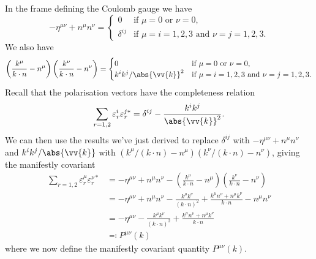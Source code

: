 \documentclass[fleqn]{NotesClass}
\newcommand{\minkowskiMetric}{\eta}
\begin{document}
    In the frame defining the Coulomb gauge we have
    \begin{equation}
        -\minkowskiMetric^{\mu\nu} + n^\mu n^\nu = 
        \begin{cases}
            0 & \text{if } \mu = 0 \text{ or } \nu = 0,\\
            \delta^{ij} & \text{if } \mu = i = 1, 2, 3 \text{ and } \nu = j = 1, 2, 3.
        \end{cases}
    \end{equation}
    We also have
    \begin{equation}
        \left( \frac{k^\mu}{k \cdot n} - n^\mu \right)\left( \frac{k^\nu}{k \cdot n} - n^\nu \right) = 
        \begin{cases}
            0 & \text{if } \mu = 0 \text{ or } \nu = 0,\\
            k^ik^j/\abs{\vv{k}}^2 & \text{if } \mu = i = 1, 2, 3 \text{ and } \nu = j = 1, 2, 3.
        \end{cases}
    \end{equation}
    Recall that the polarisation vectors have the completeness relation
    \begin{equation}
        \sum_{r=1,2} \varepsilon^i_r \varepsilon^{j*}_r = \delta^{ij} - \frac{k^ik^j}{\abs{\vv{k}}^2}.
    \end{equation}
    We can then use the results we've just derived to replace \(\delta^{ij}\) with \(-\minkowskiMetric^{\mu\nu} + n^\mu n^\nu\) and \(k^ik^j/\abs{\vv{k}}\) with \((k^\mu/(k\cdot n) - n^\mu)(k^\nu/(k\cdot n) - n^\nu)\), giving the manifestly covariant
    \begin{align}
        \sum_{r=1,2} \varepsilon_r^\mu \varepsilon_r^{\nu*} &= -\minkowskiMetric^{\mu\nu} + n^\mu n^\nu - \left( \frac{k^\mu}{k \cdot n} - n^\mu \right) \left( \frac{k^\nu}{k \cdot n} - n^\nu \right)\\
        &= -\minkowskiMetric^{\mu\nu} + n^\mu n^\nu - \frac{k^\mu k^\nu}{(k \cdot n)^2} + \frac{k^\mu n^\nu + n^\mu k^\nu}{k \cdot n} - n^\mu n^\nu\\
        &= -\minkowskiMetric^{\mu\nu} - \frac{k^\mu k^\nu}{(k \cdot n)^2} + \frac{k^\mu n^\nu + n^\mu k^\nu}{k \cdot n}\\
        &\eqqcolon P^{\mu\nu}(k)
    \end{align}
    where we now define the manifestly covariant quantity \(P^{\mu\nu}(k)\).
    
\end{document}
